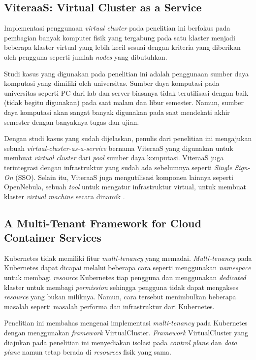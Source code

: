 \subsection{ViteraaS: Virtual Cluster as a Service}

Implementasi penggunaan \emph{virtual cluster} pada penelitian ini
berfokus pada pembagian banyak komputer fisik yang tergabung pada satu klaster
menjadi beberapa klaster virtual yang lebih kecil sesuai dengan kriteria yang diberikan oleh
pengguna seperti jumlah \emph{nodes} yang dibutuhkan.

Studi kasus yang digunakan pada penelitian ini adalah penggunaan sumber daya komputasi yang dimiliki oleh
universitas. Sumber daya komputasi pada universitas seperti PC dari lab dan server biasanya tidak
terutilisasi dengan baik (tidak begitu digunakan) pada saat malam dan libur semester. Namun, sumber daya
komputasi akan sangat banyak digunakan pada saat mendekati akhir semester dengan banyaknya tugas dan
ujian.

Dengan studi kasus yang sudah dijelaskan, penulis dari penelitian ini mengajukan sebuah \emph{virtual-cluster-as-a-service} bernama ViteraaS
yang digunakan untuk membuat \emph{virtual cluster} dari \emph{pool} sumber daya komputasi.
ViteraaS juga terintegrasi dengan infrastruktur yang sudah ada sebelumnya seperti \emph{Single Sign-On} (SSO).
Selain itu, ViteraaS juga mengutilisasi komponen lainnya seperti OpenNebula, sebuah \emph{tool} untuk mengatur infrastruktur virtual,
untuk membuat klaster \emph{virtual machine} secara dinamik \parencite{6133210}.

\subsection{A Multi-Tenant Framework for Cloud Container Services}

Kubernetes tidak memiliki fitur \emph{multi-tenancy} yang memadai. \emph{Multi-tenancy}
pada Kubernetes dapat dicapai melalui beberapa cara seperti menggunakan \emph{namespace}
untuk membagi \emph{resource} Kubernetes tiap pengguna dan menggunakan \emph{dedicated} klaster
untuk membagi \emph{permission} sehingga pengguna tidak dapat mengakses \emph{resource}
yang bukan miliknya. Namun, cara tersebut menimbulkan beberapa masalah seperti masalah
performa dan infrastruktur dari Kubernetes.

Penelitian ini membahas mengenai implementasi \emph{multi-tenancy} pada
Kubernetes dengan menggunakan \emph{framework} VirtualCluster. \emph{Framework}
VirtualCluster yang diajukan pada penelitian ini menyediakan isolasi pada \emph{control plane}
dan \emph{data plane} namun tetap berada di \emph{resources} fisik yang sama.


